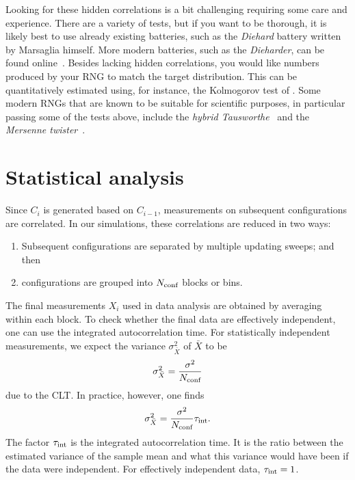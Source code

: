 Looking for these hidden correlations is a bit challenging requiring some care
and experience. There are a variety of tests, but if you want to be thorough,
it is likely best to use already existing batteries, such as the {\it Diehard}
battery written by Marsaglia himself. More modern batteries, 
such as the {\it Dieharder}, can be found online~\cite{dieharder}.
Besides lacking hidden correlations, you would like numbers produced by your
RNG to match the target distribution. This can be quantitatively estimated
using, for instance, the Kolmogorov test of .
Some modern RNGs that are known to be suitable for scientific purposes,
in particular passing some of the tests above, include
the 
{\it hybrid Tausworthe}~\cite{tausworthe_random_1965,lecuyer_maximally_1996}
and 
the {\it Mersenne twister}~\cite{matsumoto_mersenne_1998}.

\section{Statistical analysis}\label{sec:statana}

Since $C_i$ is generated based on $C_{i-1}$, measurements on subsequent
configurations are correlated. In our simulations, these
correlations are reduced in two ways:
\begin{enumerate}
  \item Subsequent configurations are separated by multiple updating sweeps;
        and then
  \item configurations are grouped into $N_{\text{conf}}$ blocks or bins.
\end{enumerate}
The final measurements $X_i$ used in data analysis are obtained by averaging
within each block.
To check whether the final data are effectively independent, one can use
the integrated autocorrelation time. 
For statistically independent measurements, we expect the variance 
$\sigma^2_{\bar{X}}$ of $\bar{X}$ to be
\begin{equation}
  \sigma^2_{\bar{X}}=\frac{\sigma^2}{N_{\text{conf}}}
\end{equation}
due to the CLT. In practice, however, one finds 
\begin{equation}
  \sigma^2_{\bar{X}}=\frac{\sigma^2}{N_{\text{conf}}}\tau_\text{int}.
\end{equation}
The factor $\tau_\text{int}$ is the integrated autocorrelation time. It is the 
ratio between the estimated variance of the sample
mean and what this variance would have been if the data were independent.
For effectively independent data, $\tau_\text{int}=1$.

